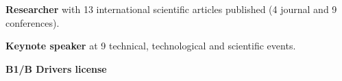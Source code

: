 

\begin{cventries}

  \cventry
    {} 
    {} 
    {} 
    {} 
    {
      \vspace{-.6cm}
      \begin{cvitems} %
        \item[] {\hspace{-.4cm} \textbf{Researcher} with 13 international scientific articles published (4 journal and 9 conferences).}
        \item[] {\hspace{-.4cm} \textbf{Keynote speaker} at 9 technical, technological and scientific events.}
        \item[] {\hspace{-.4cm} \textbf{B1/B Drivers license}}
      \end{cvitems}
    }

\end{cventries}
